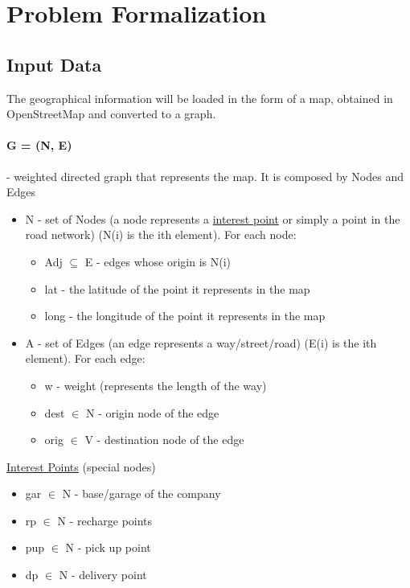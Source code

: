 \section{Problem Formalization}


\subsection{Input Data}
The geographical information will be loaded in the form of a map, obtained in OpenStreetMap and converted to a graph.
\paragraph{G = (N, E)} - weighted directed graph that represents the map. It is composed by Nodes and Edges
\begin{itemize}

	\item N - set of Nodes (a node represents a \uline{interest point} or simply a point in the road network) (N(i) is the ith element). For each node:
\begin{itemize}
	\item Adj $ \subseteq $  E - edges whose origin is N(i)
	\item lat - the latitude of the point it represents in the map
	\item long - the longitude of the point it represents in the map
\end{itemize}

	\item A - set of Edges (an edge represents a way/street/road) (E(i) is the ith element). For each edge:
\begin{itemize}
	\item w - weight (represents the length of the way)
	\item dest $ \in $  N - origin node of the edge
	\item orig $ \in $  V - destination node of the edge
\end{itemize}

\end{itemize}

\uline{Interest Points} (special nodes)
\begin{itemize}
	\item gar $ \in $  N - base/garage of the company
	\item rp $ \in $  N - recharge points
	\item pup $ \in $  N - pick up point
	\item dp $ \in $  N - delivery point
\end{itemize}

